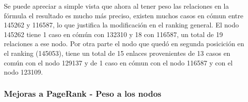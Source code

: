Se puede apreciar a simple vista que ahora al tener peso las relaciones en la fórmula el resultado es mucho más preciso, existen muchos casos en cómun entre 145262 y 116587, lo que justifica la modificación en el ranking general. El nodo 
145262 tiene 1 caso en cómún con 132310 y 18 con 116587, un total de 19 relaciones a ese nodo. Por otra parte el nodo que quedó en segunda posicición en el ranking (145053), tiene un total de 15 enlaces provenientes de 13 casos en común con el nodo 129137 y de 1 caso en cómun con el nodo 116587 y con el nodo 123109.

\subsubsection{Mejoras a PageRank - Peso a los nodos}

